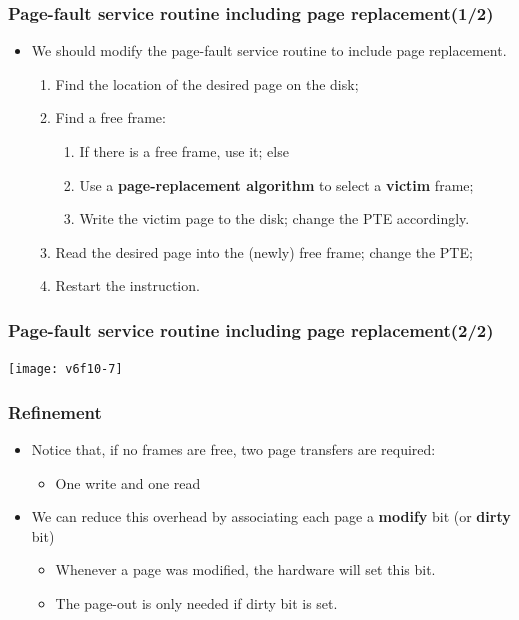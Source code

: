 \documentclass[CJKutf8,dvipsnames,table]{beamer}
\begin{document}
\begin{CJK*}{UTF8}{song}
  \begin{frame}
    \frametitle{Page-fault service routine including page replacement(1/2)} \pause
    \begin{itemize}
    \item We should modify the page-fault service routine to include page replacement.  \pause
      \begin{enumerate}
      \item Find the location of the desired page on the disk;  \pause
      \item Find a free frame:   \pause
        \begin{enumerate}
        \item If there is a free frame, use it; else  \pause
        \item Use a \textbf{page-replacement algorithm} to select a \textbf{victim} frame;  \pause
        \item Write the victim page to the disk; change the PTE accordingly.  \pause
        \end{enumerate}
      \item Read the desired page into the (newly) free frame; change the PTE;  \pause
      \item Restart the instruction. 
      \end{enumerate}
    \end{itemize}
  \end{frame}
  
  \begin{frame}
    \frametitle{Page-fault service routine including page replacement(2/2)} \pause
    \begin{center}
      \texttt{[image: v6f10-7]}
    \end{center}
  \end{frame}
  
  \begin{frame}
    \frametitle{Refinement} \pause
    \begin{itemize}
    \item Notice that, if no frames are free, two page transfers are required:   \pause
      \begin{itemize}
      \item One write and one read  \pause
      \end{itemize}
    \item We can reduce this overhead by associating each page a \textbf{modify} bit (or \textbf{dirty} bit)  \pause
      \begin{itemize}
      \item Whenever a page was modified, the hardware will set this bit.  \pause
      \item The page-out is only needed if dirty bit is set. 
      \end{itemize}
    \end{itemize}
  \end{frame}
  

\end{CJK*}
\end{document}
